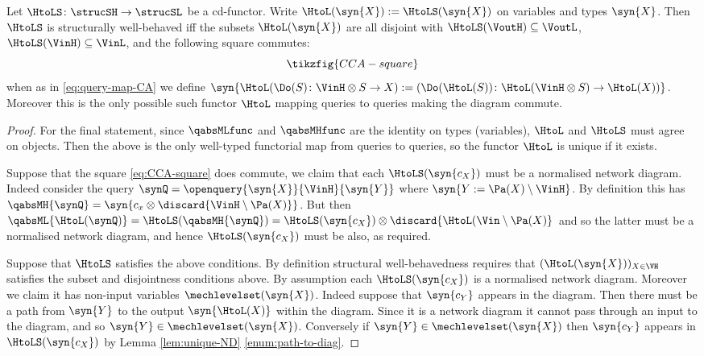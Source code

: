 \documentclass{article}
\begin{document}
{\begin{proposition} \label{prop:caus-mech-abs-main}
Let $\HtoLS \colon \strucSH \to \strucSL$ be a cd-functor. Write $\HtoL(\syn{X}) := \HtoLS(\syn{X})$ on variables and types $\syn{X}$. Then $\HtoLS$ is structurally well-behaved iff the subsets $\HtoL(\syn{X})$ are all disjoint with $\HtoLS(\VoutH) \subseteq \VoutL$, $\HtoLS(\VinH) \subseteq \VinL$, and the following square commutes: 
\begin{equation} \label{eq:CCA-square}
\tikzfig{CCA-square}
\end{equation}
when as in \ref{eq:query-map-CA} we define $\syn{\HtoL (\Do(S) \colon \VinH \otimes S \to X) := (\Do(\HtoL(S)) \colon \HtoL(\VinH \otimes S) \to \HtoL(X))}$. Moreover this is the only possible such functor $\HtoL$ mapping queries to queries making the diagram commute. 
\end{proposition}
\begin{proof}
For the final statement, since $\qabsMLfunc$ and $\qabsMHfunc$ are the identity on types (variables), $\HtoL$ and $\HtoLS$ must agree on objects. Then the above is the only well-typed functorial map from queries to queries, so the functor $\HtoL$ is unique if it exists. 

Suppose that the square \eqref{eq:CCA-square} does commute, we claim that each $\HtoLS(\syn{c_X})$ must be a normalised network diagram. Indeed consider the query $\synQ = \openquery{\syn{X}}{\VinH}{\syn{Y}}$ where $\syn{Y := \Pa(X) \setminus \VinH}$. By definition this has $\qabsMH{\synQ} = \syn{c_x \otimes \discard{\VinH \setminus \Pa(X)}}$. But then $\qabsML{\HtoL(\synQ)} = \HtoLS(\qabsMH{\synQ}) =  \HtoLS(\syn{c_X}) \otimes \discard{\HtoL(\Vin \setminus \Pa(X)}$ and so the latter must be a normalised network diagram, and hence $\HtoLS(\syn{c_X})$ must be also, as required. 

Suppose that $\HtoLS$ satisfies the above conditions. By definition structural well-behavedness requires that $(\HtoL(\syn{X}))_{X \in \VH}$ satisfies the subset and disjointness conditions above. By assumption each $\HtoLS(\syn{c_X})$ is a normalised network diagram. Moreover we claim it has non-input variables $\mechlevelset(\syn{X})$. Indeed suppose that $\syn{c_Y}$ appears in the diagram. Then there must be a path from $\syn{Y}$ to the output $\syn{\HtoL(X)}$ within the diagram. Since it is a network diagram it cannot pass through an input to the diagram, and so $\syn{Y} \in \mechlevelset(\syn{X})$. Conversely if $\syn{Y} \in \mechlevelset(\syn{X})$ then $\syn{c_Y}$ appears in $\HtoLS(\syn{c_X})$ by Lemma \ref{lem:unique-ND} \eqref{enum:path-to-diag}. 



\end{proof}}
\end{document}
